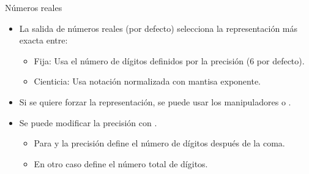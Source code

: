 \begin{frame}{Números reales}
\begin{itemize}
  \item La salida de números reales (por defecto) selecciona la representación más exacta entre:
    \begin{itemize}
      \item Fija: Usa el número de dígitos definidos por la precisión (6 por defecto).
      \item Cienticia: Usa notación normalizada con mantisa exponente.
    \end{itemize}
  \item Si se quiere forzar la representación, se puede usar los manipuladores 
        o .
  \item Se puede modificar la precisión con .
    \begin{itemize}
      \item Para  y  la precisión define el número de dígitos después de la coma.
      \item En otro caso define el número total de dígitos.
    \end{itemize}
\end{itemize}
\end{frame}
